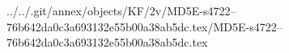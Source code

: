 ../../.git/annex/objects/KF/2v/MD5E-s4722--76b642da0c3a693132e55b00a38ab5dc.tex/MD5E-s4722--76b642da0c3a693132e55b00a38ab5dc.tex